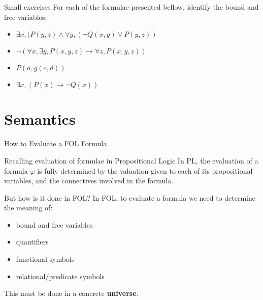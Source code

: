 \documentclass[aspectratio=169]{beamer}
\begin{document}
\begin{slide}{Small exercises}
For each of the formulae presented bellow, identify the bound and free variables:
\begin{itemize}
\item $\exists x, (P(y,z) \land \forall y, (\neg Q(x,y) \lor P(y,z))$  
\item $\neg(\forall x, \exists y, P(x,y,z) \to \forall z, P(x,y,z))$
\item $P(a,g(c,d))$
\item $\exists x, (P(x) \to \neg Q(x))$
\end{itemize}
\end{slide}

\section*{Semantics}

\begin{slide}{How to Evaluate a FOL Formula}
  \begin{block}{Recalling evaluation of formulae in Propositional Logic}
  In PL, the evaluation of a formula $\varphi$ is fully determined by the valuation given to each of its propositional variables, and the connectives involved in the formula.  
  \end{block}
  
  \begin{block}{But how is it done in FOL?}
  In FOL, to evaluate a formula we need to determine the meaning of:
    \begin{itemize}
    \item bound and free variables
    \item quantifiers
    \item functional symbols
    \item relational/predicate symbols
    \end{itemize}
    This must be done in a concrete {\bf universe}.
  \end{block}
\end{slide}
\end{document}
